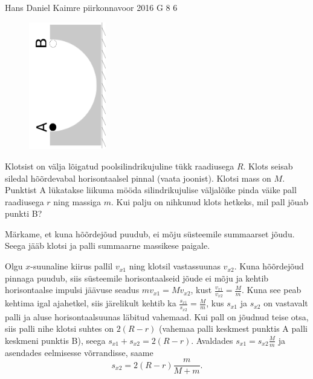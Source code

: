 {Hans Daniel Kaimre} %
{piirkonnavoor} %
{2016} %
{G 8} %
{6} %
{
\ifStatement
\begin{figure}
	\vspace{-15pt}
	\includegraphics[angle=-90,origin=c,width=0.3\textwidth]{2016-v2g-08-halfpipe.pdf}
\end{figure}
Klotsist on välja lõigatud poolsilindrikujuline tükk raadiusega $R$. Klots seisab siledal hõõrdevabal horisontaalsel pinnal (vaata joonist). Klotsi mass on $M$. Punktist A lükatakse liikuma mööda silindrikujulise väljalõike pinda väike pall raadiusega $r$ ning massiga $m$. Kui palju on nihkunud klots hetkeks, mil pall jõuab punkti B?
\fi


\ifHint
Märkame, et kuna hõõrdejõud puudub, ei mõju süsteemile summaarset jõudu. Seega jääb klotsi ja palli summaarne massikese paigale.
\fi


\ifSolution
Olgu $x$-suunaline kiirus pallil $v_{x1}$ ning klotsil vastassuunas $v_{x2}$. Kuna hõõrdejõud pinnaga puudub, siis süsteemile horisontaalseid jõude ei mõju ja kehtib horisontaalse impulsi jäävuse seadus $mv_{x1}=Mv_{x2}$, kust $\frac{v_{x1}}{v_{x2}}=\frac{M}{m}$. Kuna see peab kehtima igal ajahetkel, siis järelikult kehtib ka $\frac{s_{x1}}{s_{x2}}=\frac{M}{m}$, kus $s_{x1}$ ja $s_{x2}$ on vastavalt palli ja aluse horisontaalsuunas läbitud vahemaad. Kui pall on jõudnud teise otsa, siis palli nihe klotsi suhtes on $2(R-r)$ (vahemaa palli keskmest punktis A palli keskmeni punktis B), seega $s_{x1}+s_{x2}=2(R-r)$. Avaldades $s_{x1} = s_{x2}\frac Mm$ ja asendades eelmisesse võrrandisse, saame 
$$s_{x2}=2(R-r)\frac{m}{M+m}.$$
\fi


}
